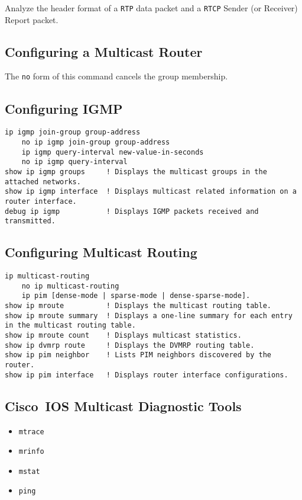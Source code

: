 \documentclass{../UTNetLab}
\begin{document}
    Analyze the header format of a \texttt{RTP} data packet and a \texttt{RTCP} Sender (or Receiver) Report packet.


\begin{appendices}

\section{Configuring a Multicast Router}
    The \lstinline[language={cisco}]{no} form of this command cancels the group membership.
    \begin{subappendices}
\subsection{Configuring IGMP}
    \begin{lstlisting}[language={cisco}, emph={group-address, new-value-in-seconds}]
    ip igmp join-group group-address
    no ip igmp join-group group-address
    ip igmp query-interval new-value-in-seconds
    no ip igmp query-interval
show ip igmp groups     ! Displays the multicast groups in the attached networks.
show ip igmp interface  ! Displays multicast related information on a router interface.
debug ip igmp           ! Displays IGMP packets received and transmitted.
    \end{lstlisting}

\subsection{Configuring Multicast Routing}
    \begin{lstlisting}[language={cisco}]
    ip multicast-routing
    no ip multicast-routing
    ip pim [dense-mode | sparse-mode | dense-sparse-mode].
show ip mroute          ! Displays the multicast routing table.
show ip mroute summary  ! Displays a one-line summary for each entry in the multicast routing table.
show ip mroute count    ! Displays multicast statistics.
show ip dvmrp route     ! Displays the DVMRP routing table.
show ip pim neighbor    ! Lists PIM neighbors discovered by the router.
show ip pim interface   ! Displays router interface configurations.
    \end{lstlisting}

\subsection{Cisco~IOS Multicast Diagnostic Tools}
    \begin{itemize}
        \item \lstinline[language={cisco}]{mtrace}
        \item \lstinline[language={cisco}]{mrinfo}
        \item \lstinline[language={cisco}]{mstat}
        \item \lstinline[language={cisco}]{ping}
    \end{itemize}

    \end{subappendices}
\end{appendices}
\end{document}
